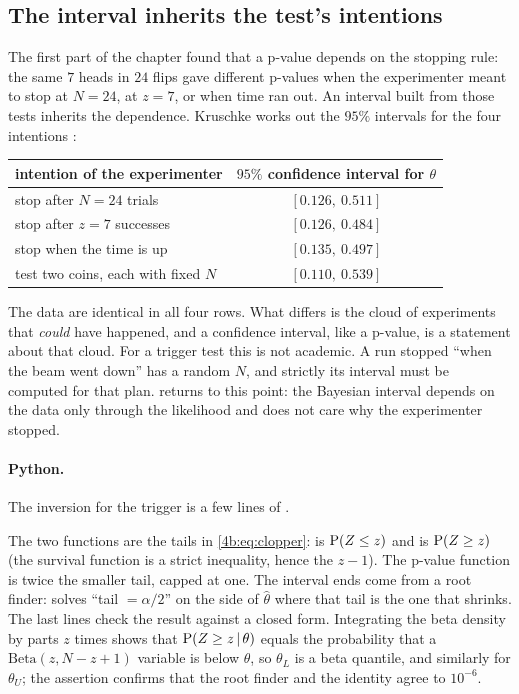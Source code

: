 \subsection{The interval inherits the test's intentions}
\label{4b:sec:ci-intentions}

The first part of the chapter found that a p-value depends on the stopping
rule: the same $7$ heads in $24$ flips gave different p-values when the
experimenter meant to stop at $N=24$, at $z=7$, or when time ran out. An
interval built from those tests inherits the dependence. Kruschke works out the
$95\%$ intervals for the four intentions :
\begin{center}
\begin{tabular}{lc}
\toprule
intention of the experimenter & $95\%$ confidence interval for $\theta$ \\
\midrule
stop after $N=24$ trials & $[0.126,\ 0.511]$ \\
stop after $z=7$ successes & $[0.126,\ 0.484]$ \\
stop when the time is up & $[0.135,\ 0.497]$ \\
test two coins, each with fixed $N$ & $[0.110,\ 0.539]$ \\
\bottomrule
\end{tabular}
\end{center}
The data are identical in all four rows. What differs is the cloud of
experiments that \emph{could} have happened, and a confidence interval, like a
p-value, is a statement about that cloud. For a trigger test this is not
academic. A run stopped ``when the beam went down'' has a random $N$, and
strictly its interval must be computed for that plan. 
returns to this point: the Bayesian interval depends on the data only through
the likelihood and does not care why the experimenter stopped.

\paragraph{Python.}
The inversion for the trigger is a few lines of
.


The two functions are the tails in \eqref{4b:eq:clopper}:
 is $\operatorname{P}(Z\le z)$ and  is
$\operatorname{P}(Z\ge z)$ (the survival function is a strict inequality, hence the
$z-1$). The p-value function is twice the smaller tail, capped at one. The
interval ends come from a root finder:  solves ``tail $=\alpha/2$''
on the side of $\hat\theta$ where that tail is the one that shrinks. The last
lines check the result against a closed form. Integrating the beta density by
parts $z$ times shows that $\operatorname{P}(Z\ge z\,\vert\,\theta)$ equals the probability that
a $\mathrm{Beta}(z,N-z+1)$ variable is below $\theta$, so $\theta_L$ is a beta
quantile, and similarly for $\theta_U$; the assertion confirms that the root
finder and the identity agree to $10^{-6}$.


